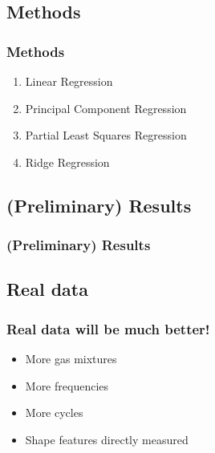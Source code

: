 \documentclass{beamer}
\begin{document}
\begin{frame}
	\section{Methods}
	\frametitle{Methods}
	
	\begin{enumerate}
		\item Linear Regression
		\item Principal Component Regression
		\item Partial Least Squares Regression
		\item Ridge Regression
	\end{enumerate}
	
\end{frame}

\begin{frame}
	\section{(Preliminary) Results}
	\frametitle{(Preliminary) Results}
\end{frame}

\begin{frame}
	\section{Real data}
	\frametitle{Real data will be much better!}
	
	\begin{itemize}
		\item More gas mixtures
		\item More frequencies
		\item More cycles
		\item Shape features directly measured
		\end{itemize}
	
\end{frame}
\end{document}
